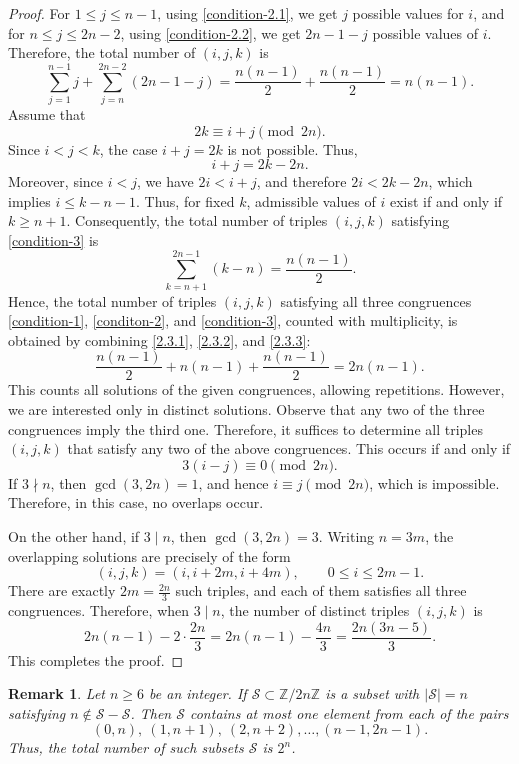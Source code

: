 \documentclass[11pt,reqno]{amsart}
\numberwithin{equation}{section}
\newtheorem{remark}[theorem]{Remark}
\begin{document}
\begin{proof}
For  $1\leq j\leq n-1$, using \eqref{condition-2.1}, we get $j$  possible values for $i$, and for $n\leq j\leq 2n-2$, using \eqref{condition-2.2}, we get $2n-1-j$ possible values of $i$.  Therefore, the total number of $(i,j,k)$ is 
\begin{equation}\label{2.3.2}
    \sum_{j=1}^{n-1} j + \sum_{j=n}^{2n-2}(2n-1-j)=\frac{n(n-1)}{2}+\frac{n(n-1)}{2}= n(n-1).
\end{equation}
Assume that \begin{equation}\label{condition-3}
    2k \equiv i+j \pmod{2n}.
\end{equation} Since $i<j<k$, the case  $i+j=2k$ is not possible. Thus, $$i+j=2k-2n.$$ Moreover, since $i<j$, we have $2i<i+j$, and therefore $2i<2k-2n$, which implies $i\leq k-n-1$.
Thus, for fixed $k$, admissible values of $i$ exist if and only if  $k\geq n+1$. Consequently, the total number of triples  $(i,j,k)$ satisfying \eqref{condition-3} is
\begin{equation}\label{2.3.3}
   \sum_{k=n+1}^{2n-1}(k-n)=\frac{n(n-1)}{2}. 
\end{equation}
 Hence, the total number of triples  $(i,j,k)$ 
satisfying all three congruences \eqref{condition-1}, \eqref{conditon-2}, and \eqref{condition-3}, counted with multiplicity, is obtained by combining \eqref{2.3.1}, \eqref{2.3.2}, and \eqref{2.3.3}:  $$\frac{n(n-1)}{2}+n(n-1)+\frac{n(n-1)}{2}=2n(n-1).$$
This counts all solutions of the given congruences, allowing repetitions. However, we are interested only in distinct solutions. Observe that any two of the three congruences imply the third one. Therefore, it suffices to determine all triples $(i,j,k)$  that satisfy any two of the above congruences. This occurs if and only if
$$3(i-j)\equiv0 \pmod{2n}.$$
If $3\nmid n$, then $\gcd(3,2n)=1$, and hence  $i\equiv j\pmod{2n}$, which is
impossible. Therefore, in this case, no overlaps occur.\par
On the other hand, if $3\mid n$, then $\gcd(3,2n)=3$. Writing $n=3m$, the overlapping solutions are precisely of the form
$$(i,j,k)=(i, i+2m, i+4m),\qquad 0 \leq i \leq 2m-1.$$
There are exactly  $2m=\frac{2n}{3}$ such triples, and each of them satisfies all three congruences. Therefore, when  $3\mid n$, the number of distinct triples $(i,j,k)$ is
$$2n(n-1) - 2\cdot\frac{2n}{3}= 2n(n-1)-\frac{4n}{3}= \frac{2n(3n-5)}{3}.$$
This completes the proof.
\end{proof}
\begin{remark}\label{remark 2.3}
Let $n\geq6$ be an integer. If $\mathcal{S}\subset \mathbb{Z}/2n\mathbb{Z}$ is a subset with $|\mathcal{S}|=n$ satisfying $n\not\in \mathcal{S}-\mathcal{S}$. Then  $\mathcal{S}$ contains at most one element from each of the pairs 
$$(0,n),~(1,n+1),~(2,n+2),\ldots,(n-1,2n-1).$$
Thus, the total number of such subsets $\mathcal{S}$ is $2^n$.   
\end{remark}
\end{document}
